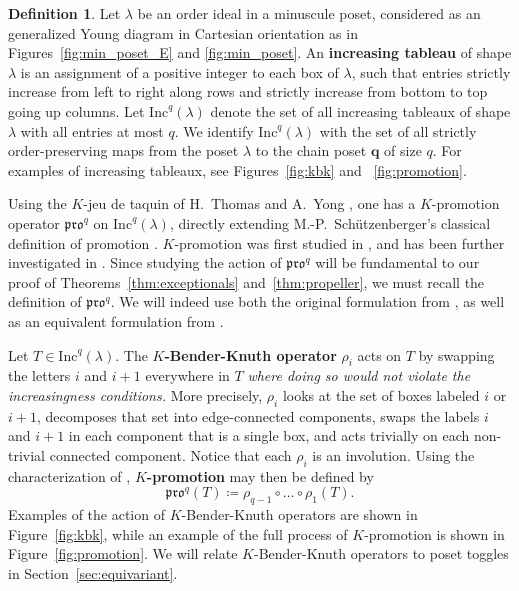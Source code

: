\documentclass[12pt]{amsart}
\theoremstyle{definition}
\newtheorem{definition}[theorem]{Definition}
\theoremstyle{remark}
\numberwithin{equation}{section}
\newcommand{\inc}{\ensuremath{\mathrm{Inc}}}
\newcommand{\pro}{\mathfrak{pro}}
\begin{document}
\begin{definition}
Let $\lambda$ be an order ideal in a minuscule poset, considered as an generalized Young diagram in Cartesian orientation as in Figures~\ref{fig:min_poset_E} and \ref{fig:min_poset}. An {\bf increasing tableau} of shape $\lambda$ is an assignment of a positive integer to each box of $\lambda$, such that entries strictly increase from left to right along rows and strictly increase from bottom to top going up columns. Let $\inc^q(\lambda)$ denote the set of all increasing tableaux of shape $\lambda$ with all entries at most $q$. We identify $\inc^q(\lambda)$ with the set of all strictly order-preserving maps from the poset $\lambda$ to the chain poset $\mathbf{q}$ of size $q$. For examples of increasing tableaux, see Figures~\ref{fig:kbk} and ~\ref{fig:promotion}.
\end{definition}

Using the $K$-jeu de taquin of H.~Thomas and A.~Yong \cite{Thomas.Yong:K}, one has a $K$-promotion operator $\pro^q$ on $\inc^q(\lambda)$, directly extending M.-P.~Sch\"utzenberger's classical definition of promotion \cite{Schutzenberger:promotion}. $K$-promotion was first studied in \cite{Pechenik}, and has been further investigated in \cite{BPS, Pressey.Stokke.Visentin, Rhoades:skein, DPS, Pechenik:frames,Vorland}. Since studying the action of $\pro^q$ will be fundamental to our proof of Theorems~\ref{thm:exceptionals} and~\ref{thm:propeller}, we must recall the definition of $\pro^q$. 
We will indeed use both the original formulation from \cite{Pechenik}, as well as an equivalent formulation from \cite[Proposition~2.4]{DPS}.

Let $T \in \inc^q(\lambda)$. The {\bf $K$-Bender-Knuth operator} $\rho_i$ acts on $T$ by swapping the letters $i$ and $i+1$ everywhere in $T$ \emph{where doing so would not violate the increasingness conditions.} More precisely, $\rho_i$ looks at the set of boxes labeled $i$ or $i+1$, decomposes that set into edge-connected components, swaps the labels $i$ and $i+1$ in each component that is a single box, and acts trivially on each non-trivial connected component. 
Notice that each $\rho_i$ is an involution.
Using the characterization of \cite[Proposition~2.4]{DPS}, {\bf $K$-promotion} may then be defined by
\[
\pro^q(T) \coloneqq \rho_{q-1} \circ \dots \circ \rho_1(T).
\]
Examples of the action of $K$-Bender-Knuth operators are shown in Figure~\ref{fig:kbk}, while an example of the full process of $K$-promotion is shown in Figure~\ref{fig:promotion}. We will relate $K$-Bender-Knuth operators to poset toggles in Section~\ref{sec:equivariant}.
\end{document}

